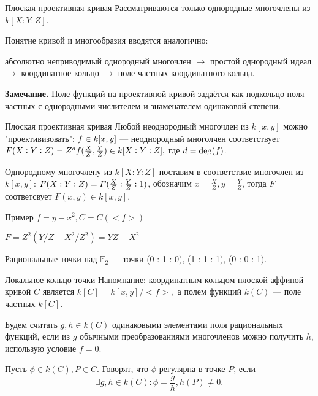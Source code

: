 \documentclass{beamer}
\begin{document}
\begin {frame}  {Плоская проективная кривая}
Рассматриваются только однородные многочлены из $k[X : Y : Z]$.
\newline

Понятие кривой и многообразия вводятся аналогично:

 абсолютно неприводимый однородный многочлен $\to$ простой однородный идеал $\to$ координатное кольцо $\to$ поле частных координатного кольца.
\newline

{\bf Замечание.} Поле функций на проективной кривой задаётся как подкольцо поля частных с однородными числителем и знаменателем одинаковой степени.
\newline
\end {frame}

\begin {frame}  {Плоская проективная кривая}
Любой неоднородный многочлен из $k[x,y]$ можно "проективизовать":  $f \in {\sl k}[x,y]$ --- неоднородный многолчен соответствует
\newline
 ${\sl F}({\sl X} : {\sl Y} : {\sl Z}) = {\sl Z^{\sl d}}{\sl f}({\frac {\sl X}{\sl Z}} , {\frac {\sl Y}{\sl Z}}) \in {\sl k}[ {\sl X} : {\sl Y} : {\sl Z}],$
 где ${\sl d} = {\rm deg}({\sl f})$.
\newline

Однородному многочлену из $k[X : Y : Z]$ поставим в соответствие многочлен из $k[x,y]$:
\newline
 ${\sl F}({\sl X} : {\sl Y} : {\sl Z}) = {\sl F}({\frac {\sl X}{\sl Z}} : {\frac {\sl Y}{\sl Z}} : 1)$, обозначим $x = \frac {X}{Z}, y = \frac {Y}{Z}$, тогда $F$ соответсвует $F(x,y) \in k[x,y].$
\end {frame}

\begin {frame} {Пример}
$f = y - x^2, C = C(<f>)$

$F = Z^2(Y/Z - X^2/Z^2) = YZ - X^2$

Рациональные точки над ${\mathbb F}_2$ --- точки (0 : 1 : 0), (1 : 1 : 1), (0 : 0 : 1).
\end {frame}

\begin {frame}  {Локальное кольцо точки}
Напомнание: координатным кольцом плоской аффиной кривой $C$ является $k[C] = k[x,y]/<f>,$ а полем функций $k(C)$ --- поле частных $k[C]$.
\newline

Будем считать $g, h \in k(C)$ одинаковыми элементами поля рациональных функций, если из $g$ обычными преобразованиями многочленов можно получить $h$, использую условие $f = 0$.
\newline

Пусть $\phi \in k(C), P \in C$. Говорят, что $\phi$ регулярна в точке $P$, если $$\exists g,h \in k(C) : \phi = \frac {g}{h}, h(P) \ne 0.$$
\end {frame}
\end{document}
